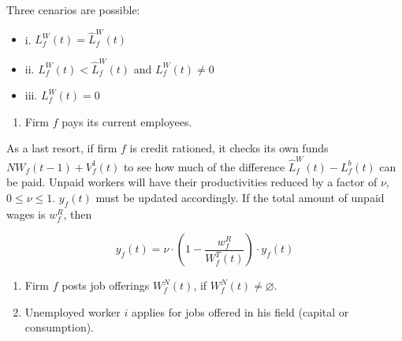 \documentclass[11pt,]{article}
\providecommand{\tightlist}{%
\setlength{\itemsep}{0pt}\setlength{\parskip}{0pt}}
\begin{document}
Three cenarios are possible:

\begin{itemize}
  \item[] i. $L_f^W(t) = \hat{L}^W_f(t)$
  
  
  \item[] ii. $L_f^W(t) < \hat{L}^W_f(t)$ and $L_f^W(t) \neq 0$
  
  
  \item[] iii. $L_f^W(t) = 0$
  
  
\end{itemize}

\begin{enumerate}
\def\labelenumi{\alph{enumi}.}
\setcounter{enumi}{4}
\tightlist
\item
  Firm \(f\) pays its current employees.
\end{enumerate}

As a last resort, if firm \(f\) is credit rationed, it checks its own
funds \(NW_f(t-1) + V^1_f(t)\) to see how much of the difference
\(\hat{L}^W_f(t) - L_f^b(t)\) can be paid. Unpaid workers will have
their productivities reduced by a factor of \(\nu\),
\(0 \leq \nu \leq 1\). \(y_f(t)\) must be updated accordingly. If the
total amount of unpaid wages is \(w^R_f\), then

\begin{equation}
  y_f(t) = \nu\cdot \left(1 - \frac{w^R_f}{W^T_f(t)}\right) \cdot y_f(t)
\end{equation}

\begin{enumerate}
\def\labelenumi{\alph{enumi}.}
\setcounter{enumi}{5}
\item
  Firm \(f\) posts job offerings \(W^N_f(t)\), if
  \(W^N_f(t) \neq \varnothing\).
\item
  Unemployed worker \(i\) applies for jobs offered in his field (capital
  or consumption).
\end{enumerate}
\end{document}
